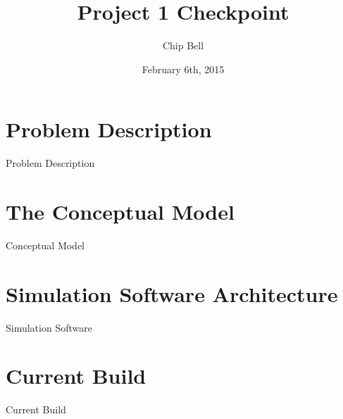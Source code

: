 \documentclass[a4paper,12pt]{article}
\begin{document}
\title{Project 1 Checkpoint}
\author{Chip Bell}
\date{February 6th, 2015}
\maketitle

\section{Problem Description}
Problem Description

\section{The Conceptual Model}
Conceptual Model

\section{Simulation Software Architecture}
Simulation Software

\section{Current Build}
Current Build

\cite{pde_solution}


\end{document}
